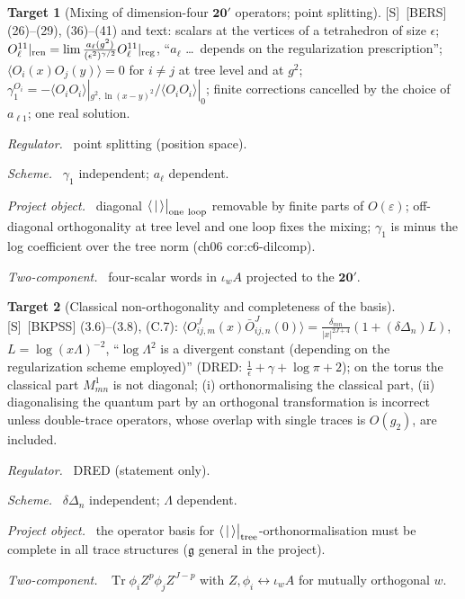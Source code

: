 \documentclass[11pt]{article}
\theoremstyle{definition}
\newtheorem{target}{Target}
\newcommand{\Tr}{\operatorname{Tr}}
\newcommand{\Sl}{\textup{[S]}}
\newcommand{\tree}{\big|_{\rm tree}}
\newcommand{\oneloop}{\big|_{\rm one\ loop}}
\newcommand{\fld}[1]{\par\textit{#1.}\ }
\begin{document}
\begin{target}[Mixing of dimension-four $\mathbf{20'}$ operators; point splitting]\label{t:bers}
\Sl\ [BERS] (26)--(29), (36)--(41) and text: scalars at the vertices of a tetrahedron of size $\epsilon$; $O^{11}_\ell|_{\rm ren}=\lim\frac{a_\ell(g^2)}{(\epsilon^2)^{\gamma/2}}O^{11}_\ell|_{\rm reg}$, ``$a_\ell$ \dots\ depends on the regularization prescription''; $\langle O_i(x)O_j(y)\rangle=0$ for $i\ne j$ at tree level and at $g^2$; $\gamma_1^{O_i}=-\langle O_iO_i\rangle|_{g^2,\ln(x-y)^2}/\langle O_iO_i\rangle|_0$; finite corrections cancelled by the choice of $a_{\ell1}$; one real solution.
\fld{Regulator} point splitting (position space).
\fld{Scheme} $\gamma_1$ independent; $a_\ell$ dependent.
\fld{Project object} diagonal $\langle\,|\,\rangle\oneloop$ removable by finite parts of $O(\varepsilon)$; off-diagonal orthogonality at tree level and one loop fixes the mixing; $\gamma_1$ is minus the log coefficient over the tree norm (ch06 cor:c6-dilcomp).
\fld{Two-component} four-scalar words in $\iota_{w}A$ projected to the $\mathbf{20'}$.
\end{target}

\begin{target}[Classical non-orthogonality and completeness of the basis]\label{t:bkpss}
\Sl\ [BKPSS] (3.6)--(3.8), (C.7): $\langle O^J_{ij,m}(x)\bar O^J_{ij,n}(0)\rangle=\frac{\delta_{mn}}{|x|^{2J+4}}(1+(\delta\Delta_n)L)$, $L=\log(x\Lambda)^{-2}$, ``$\log\Lambda^2$ is a divergent constant (depending on the regularization scheme employed)'' (DRED: $\frac1\epsilon+\gamma+\log\pi+2$); on the torus the classical part $M^1_{mn}$ is not diagonal; (i) orthonormalising the classical part, (ii) diagonalising the quantum part by an orthogonal transformation is incorrect unless double-trace operators, whose overlap with single traces is $O(g_2)$, are included.
\fld{Regulator} DRED (statement only).
\fld{Scheme} $\delta\Delta_n$ independent; $\Lambda$ dependent.
\fld{Project object} the operator basis for $\langle\,|\,\rangle\tree$-orthonormalisation must be complete in all trace structures ($\mathfrak g$ general in the project).
\fld{Two-component} $\Tr\phi_iZ^p\phi_jZ^{J-p}$ with $Z,\phi_i\leftrightarrow\iota_wA$ for mutually orthogonal $w$.
\end{target}
\end{document}
